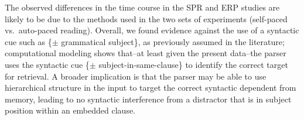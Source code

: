 \documentclass[a4paper, man, floatsintext]{apa7}
\begin{document}
The observed differences in the time course in the SPR and ERP studies are likely to be due to the methods used in the two sets of experiments (self-paced vs.\ auto-paced reading). Overall, we found evidence against the use of a syntactic cue such as \{$\pm$ grammatical subject\}, as previously assumed in the literature; computational modeling shows that--at least given the present data--the parser uses the syntactic cue  \{$\pm$ subject-in-same-clause\}  to identify the correct target for retrieval.  A broader implication is that the parser may be able to use hierarchical structure in the input to target the correct syntactic dependent from memory, leading to no syntactic interference from a distractor that is in subject position within an embedded clause.




\newpage
\printbibliography
\end{document}
